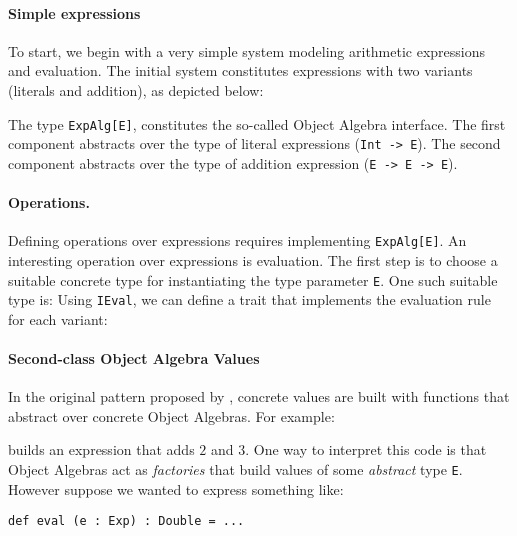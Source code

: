 \paragraph{Simple expressions}
To start, we begin with a very simple system modeling arithmetic expressions and
evaluation. The initial system constitutes expressions with two variants
(literals and addition), as depicted below:

\noindent The type \lstinline{ExpAlg[E]}, constitutes the so-called Object
Algebra interface. The first component abstracts over the type of literal
expressions (\lstinline{Int -> E}). The second component abstracts over the type
of addition expression (\lstinline{E -> E -> E}).

\paragraph{Operations.} Defining operations over expressions requires
implementing \lstinline{ExpAlg[E]}. An interesting operation over expressions is
evaluation. The first step is to choose a suitable concrete type for
instantiating the type parameter \lstinline{E}. One such suitable type is:
Using \lstinline{IEval}, we can define a trait that implements the evaluation
rule for each variant:

\paragraph{Second-class Object Algebra Values} In the original pattern
proposed by \citet{oliveira2012extensibility}, concrete values are built with
functions that abstract over concrete Object Algebras. For example:


\noindent builds an expression that adds $2$ and $3$. One way to
interpret this code is that Object Algebras act as \emph{factories}
that build values of some \emph{abstract} type \lstinline{E}. However
suppose we wanted to express something like:

\begin{lstlisting}
def eval (e : Exp) : Double = ...
\end{lstlisting}

